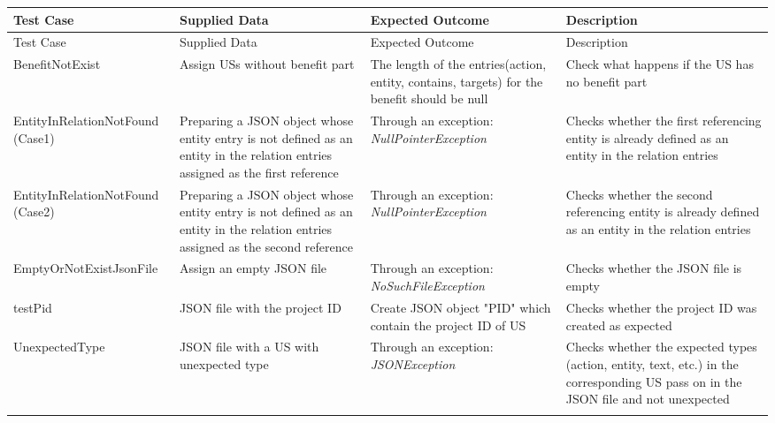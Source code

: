 \thispagestyle{empty}
\begingroup
\centering
\scriptsize
\renewcommand{\arraystretch}{1,5}
\keepXColumns
	\begin{tabularx}{\textwidth}{X  X  X  X}
	\hline
	Test Case &Supplied Data&Expected Outcome&Description\\
	\hline\hline
	\endfirsthead
	\hline
	Test Case &Supplied Data&Expected Outcome&Description\\
	\hline\hline
	\endhead
		BenefitNotExist&Assign USs without benefit part&The length of the entries(action, entity, contains, targets) for the benefit should be null&Check what happens if the US has no benefit part\\
		
		EntityInRelationNotFound \newline(Case1)&Preparing a JSON object whose entity entry is not defined as an entity in the relation entries assigned as the first reference&Through an exception: \textit{NullPointerException}&Checks whether the first referencing entity is already defined as an entity in the relation entries\\
		
		
		EntityInRelationNotFound \newline(Case2)&Preparing a JSON object whose entity entry is not defined as an entity in the relation entries assigned as the second reference&Through an exception: \textit{NullPointerException}&Checks whether the second referencing entity is already defined as an entity in the relation entries\\
		
		EmptyOrNotExistJsonFile&Assign an empty JSON file&Through an exception: \textit{NoSuchFileException}&Checks whether the JSON file is empty\\
		
		testPid&JSON file with the project ID&Create JSON object "PID" which contain the project ID of US&Checks whether the project ID was created as expected\\
		
		UnexpectedType&JSON file with a US with unexpected type&Through an exception: \textit{JSONException}&Checks whether the expected types (action, entity, text, etc.) in the corresponding US pass on in the JSON file and not unexpected\\
		
		
		\hline
		\caption{Test cases for JSONTransformer  class}\label{tb:test_cases_json_transformer}
	\end{tabularx}
\endgroup

